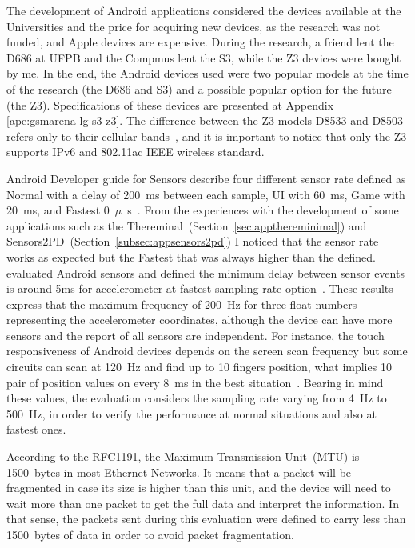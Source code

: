 The development of Android applications considered the devices available at the Universities and the price for acquiring new devices, as the research was not funded, and Apple devices are expensive.
During the research, a friend lent the D686 at UFPB and the Compmus lent the S3, while the Z3 devices were bought by me.
In the end, the Android devices used were two popular models at the time of the research (the D686 and S3) and a possible popular option for the future (the Z3).
Specifications of these devices are presented at Appendix \ref{ape:gsmarena-lg-s3-z3}.
The difference between the Z3 models D8533 and D8503 refers only to their cellular bands~\cite{Sony2017xperiaz3}, and it is important to notice that only the Z3 supports IPv6 and 802.11ac IEEE wireless standard.

Android Developer guide for Sensors describe four different sensor rate defined as Normal with a delay of 200~ms between each sample, UI with 60~ms, Game with 20~ms, and Fastest 0~$\mu$~s~\cite{Android2017sensorsoverview}.
From the experiences with the development of some applications such as the Thereminal~(Section~\ref{sec:appthereminimal}) and Sensors2PD~(Section~\ref{subsec:appsensors2pd}) I noticed that the sensor rate works as expected but the Fastest that was always higher than the defined.
 evaluated Android sensors and defined the minimum delay between sensor events is around 5ms for accelerometer at fastest sampling rate option~\cite{Ma2013experimental}.
These results express that the maximum frequency of 200~Hz for three float numbers representing the accelerometer coordinates, although the device can have more sensors and the report of all sensors are independent.
For instance, the touch responsiveness of Android devices depends on the screen scan frequency but some circuits can scan at 120~Hz and find up to 10 fingers position, what implies 10 pair of position values on every 8~ms in the best situation~\cite{Padre2017touchresponsiveness}.
Bearing in mind these values, the evaluation considers the sampling rate varying from 4~Hz to 500~Hz, in order to verify the performance at normal situations and also at fastest ones.  

According to the RFC1191, the Maximum Transmission Unit~(MTU) is 1500~bytes in most Ethernet Networks.
It means that a packet will be fragmented in case its size is higher than this unit, and the device will need to wait more than one packet to get the full data and interpret the information.
In that sense, the packets sent during this evaluation were defined to carry less than 1500~bytes of data in order to avoid packet fragmentation.

